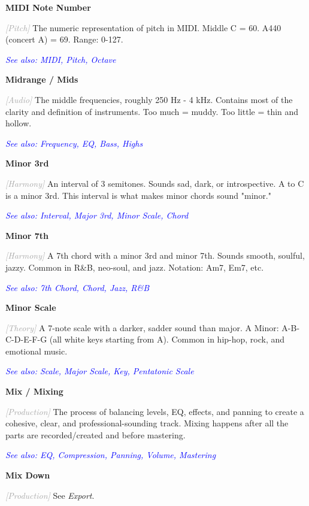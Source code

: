 \documentclass[11pt,letterpaper]{article}
\newcommand{\term}[1]{\textbf{\large\color{purple}#1}}
\newcommand{\category}[1]{\textcolor{darkgray}{\textit{\small [#1]}}}
\newcommand{\seealso}[1]{\textcolor{blue}{\textit{See also: #1}}}
\newenvironment{termdef}[1]
  {\noindent\term{#1}\par\nopagebreak}
  {\par\vspace{0.3em}}
\begin{document}
\begin{termdef}{MIDI Note Number}
\category{Pitch}
The numeric representation of pitch in MIDI. Middle C = 60. A440 (concert A) = 69. Range: 0-127.

\seealso{MIDI, Pitch, Octave}
\end{termdef}

\begin{termdef}{Midrange / Mids}
\category{Audio}
The middle frequencies, roughly 250 Hz - 4 kHz. Contains most of the clarity and definition of instruments. Too much = muddy. Too little = thin and hollow.

\seealso{Frequency, EQ, Bass, Highs}
\end{termdef}

\begin{termdef}{Minor 3rd}
\category{Harmony}
An interval of 3 semitones. Sounds sad, dark, or introspective. A to C is a minor 3rd. This interval is what makes minor chords sound "minor."

\seealso{Interval, Major 3rd, Minor Scale, Chord}
\end{termdef}

\begin{termdef}{Minor 7th}
\category{Harmony}
A 7th chord with a minor 3rd and minor 7th. Sounds smooth, soulful, jazzy. Common in R\&B, neo-soul, and jazz. Notation: Am7, Em7, etc.

\seealso{7th Chord, Chord, Jazz, R\&B}
\end{termdef}

\begin{termdef}{Minor Scale}
\category{Theory}
A 7-note scale with a darker, sadder sound than major. A Minor: A-B-C-D-E-F-G (all white keys starting from A). Common in hip-hop, rock, and emotional music.

\seealso{Scale, Major Scale, Key, Pentatonic Scale}
\end{termdef}

\begin{termdef}{Mix / Mixing}
\category{Production}
The process of balancing levels, EQ, effects, and panning to create a cohesive, clear, and professional-sounding track. Mixing happens after all the parts are recorded/created and before mastering.

\seealso{EQ, Compression, Panning, Volume, Mastering}
\end{termdef}

\begin{termdef}{Mix Down}
\category{Production}
See \textit{Export}.
\end{termdef}
\end{document}

